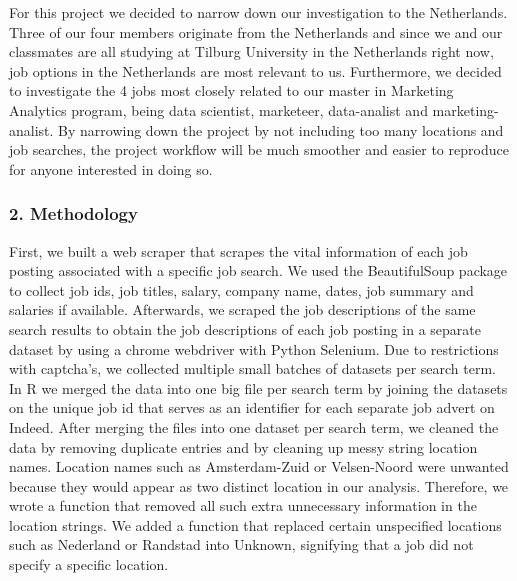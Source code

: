 \documentclass[
]{article}
\begin{document}
For this project we decided to narrow down our investigation to the
Netherlands. Three of our four members originate from the Netherlands
and since we and our classmates are all studying at Tilburg University
in the Netherlands right now, job options in the Netherlands are most
relevant to us. Furthermore, we decided to investigate the 4 jobs most
closely related to our master in Marketing Analytics program, being data
scientist, marketeer, data-analist and marketing-analist. By narrowing
down the project by not including too many locations and job searches,
the project workflow will be much smoother and easier to reproduce for
anyone interested in doing so.

\hypertarget{methodology}{%
\subsubsection{2. Methodology}\label{methodology}}

First, we built a web scraper that scrapes the vital information of each
job posting associated with a specific job search. We used the
BeautifulSoup package to collect job ids, job titles, salary, company
name, dates, job summary and salaries if available. Afterwards, we
scraped the job descriptions of the same search results to obtain the
job descriptions of each job posting in a separate dataset by using a
chrome webdriver with Python Selenium. Due to restrictions with
captcha's, we collected multiple small batches of datasets per search
term. In R we merged the data into one big file per search term by
joining the datasets on the unique job id that serves as an identifier
for each separate job advert on Indeed. After merging the files into one
dataset per search term, we cleaned the data by removing duplicate
entries and by cleaning up messy string location names. Location names
such as Amsterdam-Zuid or Velsen-Noord were unwanted because they would
appear as two distinct location in our analysis. Therefore, we wrote a
function that removed all such extra unnecessary information in the
location strings. We added a function that replaced certain unspecified
locations such as Nederland or Randstad into Unknown, signifying that a
job did not specify a specific location.
\end{document}
